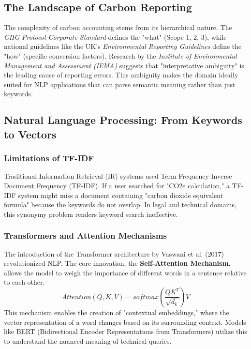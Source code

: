 \documentclass[12pt, a4paper]{article}
\begin{document}
\subsection{The Landscape of Carbon Reporting}
The complexity of carbon accounting stems from its hierarchical nature. The \textit{GHG Protocol Corporate Standard} \cite{ghgprotocol} defines the "what" (Scope 1, 2, 3), while national guidelines like the UK's \textit{Environmental Reporting Guidelines} \cite{secr} define the "how" (specific conversion factors). Research by the \textit{Institute of Environmental Management and Assessment (IEMA)} suggests that "interpretative ambiguity" is the leading cause of reporting errors. This ambiguity makes the domain ideally suited for NLP applications that can parse semantic meaning rather than just keywords.

\subsection{Natural Language Processing: From Keywords to Vectors}
\subsubsection{Limitations of TF-IDF}
Traditional Information Retrieval (IR) systems used Term Frequency-Inverse Document Frequency (TF-IDF). If a user searched for "CO2e calculation," a TF-IDF system might miss a document containing "carbon dioxide equivalent formula" because the keywords do not overlap. In legal and technical domains, this synonymy problem renders keyword search ineffective.

\subsubsection{Transformers and Attention Mechanisms}
The introduction of the Transformer architecture by Vaswani et al. (2017) \cite{attention} revolutionized NLP. The core innovation, the \textbf{Self-Attention Mechanism}, allows the model to weigh the importance of different words in a sentence relative to each other.
\begin{equation}
    Attention(Q, K, V) = softmax\left(\frac{QK^T}{\sqrt{d_k}}\right)V
\end{equation}
This mechanism enables the creation of "contextual embeddings," where the vector representation of a word changes based on its surrounding context. Models like BERT (Bidirectional Encoder Representations from Transformers) \cite{bert} utilize this to understand the nuanced meaning of technical queries.
\end{document}
